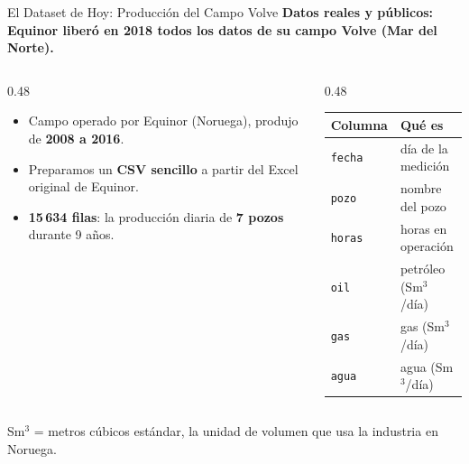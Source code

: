 \documentclass[aspectratio=169, 11pt]{beamer}
\begin{document}
\begin{frame}[fragile,shrink=8]{El Dataset de Hoy: Producción del Campo Volve}
  \vspace{-4pt}
  {\small\color{arcaDark}\bfseries
    Datos reales y públicos: Equinor liberó en 2018 todos los datos de su campo Volve (Mar del Norte).}

  \vspace{6pt}
  \begin{columns}[T]
    \begin{column}{0.48\textwidth}
      {\footnotesize\color{textMuted}
      \begin{itemize}\setlength{\itemsep}{5pt}
        \item[{\color{arcaRed}\scriptsize\faGlobe}]
          Campo operado por Equinor (Noruega),
          produjo de \textbf{2008 a 2016}.
        \item[{\color{arcaRed}\scriptsize\faDatabase}]
          Preparamos un \textbf{CSV sencillo} a partir
          del Excel original de Equinor.
        \item[{\color{arcaRed}\scriptsize\faTable}]
          \textbf{15\,634 filas}: la producción diaria
          de \textbf{7 pozos} durante 9 años.
      \end{itemize}
      }
    \end{column}

    \begin{column}{0.48\textwidth}
      {\footnotesize
      \renewcommand{\arraystretch}{1.3}
      \begin{tabular}{@{}l l@{}}
        \toprule
        {\bfseries\color{arcaRed} Columna} & {\bfseries\color{arcaDark} Qué es} \\
        \midrule
        \texttt{fecha} & día de la medición \\
        \texttt{pozo}  & nombre del pozo \\
        \texttt{horas} & horas en operación \\
        \texttt{oil}   & petróleo (Sm\(^3\)/día) \\
        \texttt{gas}   & gas (Sm\(^3\)/día) \\
        \texttt{agua}  & agua (Sm\(^3\)/día) \\
        \bottomrule
      \end{tabular}
      }
    \end{column}
  \end{columns}

  \vspace{6pt}
  {\scriptsize\color{textMuted}
    \faLightbulb[regular]\hspace{3pt}%
    Sm\(^3\) = metros cúbicos estándar, la unidad de volumen que usa la industria en Noruega.}
\end{frame}
\end{document}
